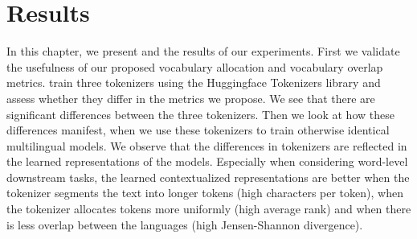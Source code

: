 \chapter{Results}



In this chapter, we present  and the results of our experiments. First we validate the usefulness of our proposed vocabulary allocation and vocabulary overlap metrics.  train three tokenizers using the Huggingface Tokenizers library and assess whether they differ in the metrics we propose. We see that there are significant differences between the three tokenizers. Then we look at how these differences manifest, when we use these tokenizers to train otherwise identical multilingual models. We observe that the differences in tokenizers are reflected in the learned representations of the models. Especially when considering word-level downstream tasks, the learned contextualized representations are better when the tokenizer segments the text into longer tokens (high characters per token), when the tokenizer allocates tokens more uniformly (high average rank) and when there is less overlap between the languages (high Jensen-Shannon divergence).

